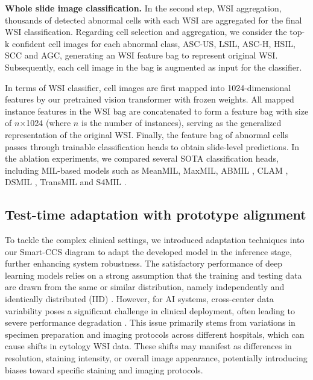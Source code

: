 \noindent \textbf{Whole slide image classification.} In the second step, WSI aggregation, thousands of detected abnormal cells with each WSI are aggregated for the final WSI classification.
Regarding cell selection and aggregation, we consider the top-k confident cell images for each abnormal class, ASC-US, LSIL, ASC-H, HSIL, SCC and AGC, generating an WSI feature bag to represent original WSI. Subsequently, each cell image in the bag is augmented as input for the classifier. 

 In terms of WSI classifier, cell images are first mapped into 1024-dimensional features by our pretrained vision transformer with frozen weights. All mapped instance features in the WSI bag are concatenated to form a feature bag with size of $n$×1024 (where $n$ is the number of instances), serving as the generalized representation of the original WSI. 
 Finally, the feature bag of abnormal cells passes through trainable classification heads to obtain slide-level predictions. In the ablation experiments, we compared several SOTA classification heads, including MIL-based models such as MeanMIL, MaxMIL, ABMIL \cite{ilse2018attention}, CLAM \cite{lu2021data}, DSMIL \cite{li2021dual}, TransMIL \cite{shao2021transmil} and S4MIL \cite{fillioux2023structured}. 

\subsection*{Test-time adaptation with prototype alignment}\label{subsec4-7pro}
To tackle the complex clinical settings, we introduced adaptation techniques into our Smart-CCS diagram to adapt the developed model in the inference stage, further enhancing system robustness.
The satisfactory performance of deep learning models relies on a strong assumption that the training and testing data are drawn from the same or similar distribution, namely independently and identically distributed (IID) \cite{quinonero2022dataset}. However, for AI systems, cross-center data variability poses a significant challenge in clinical deployment, often leading to severe performance degradation  \cite{asif2021towards}. This issue primarily stems from variations in specimen preparation and imaging protocols across different hospitals, which can cause shifts in cytology WSI data. These shifts may manifest as differences in resolution, staining intensity, or overall image appearance, potentially introducing biases toward specific staining and imaging protocols.

